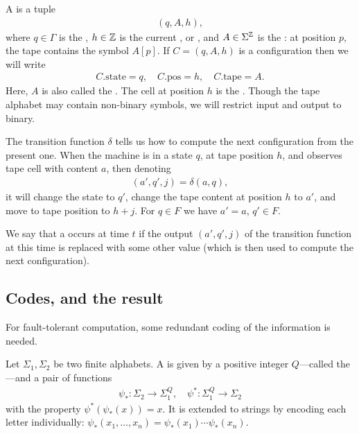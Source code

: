 \documentclass[12pt]{memoir}
\newcommand{\h}{h}
\newcommand{\pos}{\mathrm{pos}}
\newcommand{\state}{\mathrm{state}}
\newcommand{\tape}{\mathrm{tape}}
\begin{document}
    A  is a tuple
        \begin{align*}
             (q,A,\h),
        \end{align*}
    where \( q\in\Gamma \) is the , 
\( \h\in\bbZ \) is the current , or ,
and \( A\in\Sigma^{\mathbb{Z}} \) is the : 
at position \( p \), the tape contains the symbol \( A[p] \).
If \( C=(q,A,\h) \) is a configuration then we will write
        \begin{align*}
             C.\state=q,\quad C.\pos=\h, \quad C.\tape=A.
        \end{align*}
    Here, \( A \) is also called the .
    The cell at position \( \h \) is the  .
Though the tape alphabet may contain
non-binary symbols, we will restrict input and output to binary.

    The transition function \( \delta \) tells us how to compute the next
    configuration from the present one.
    When the machine is in a state \( q \), at tape position \( \h \), and
    observes tape cell with content \( a \), then denoting
         \begin{align*}
           (a',q',j)=\delta(a,q),
         \end{align*}
    it will change the state to \( q' \), change the
    tape content at position \( \h \) to \( a' \), and move to tape position to \( \h+j \).
    For \( q\in F \) we have \( a'=a \), \( q'\in F \).


\begin{definition}[Fault]\label{def:fault}
    We say that a  occurs at time \( t \) if the output \( (a',q',j) \) of the
    transition function at this time is replaced with some other value
    (which is then used to compute the next configuration).
\end{definition}


\subsection{Codes, and the result}

For fault-tolerant computation, some redundant coding of the information is needed.

\begin{definition}[Codes]\label{def:codes}
    Let \( \Sigma_{1},\Sigma_{2} \) be two finite alphabets.
    A  is given by a positive integer \( Q \)---called
    the ---and a pair of functions
    \begin{align*}
            \psi_{*} :\Sigma_{2}\to\Sigma_{1}^{Q},
            \quad
            \psi^{*}:\Sigma_{1}^{Q}\to\Sigma_{2}
    \end{align*}
    with the property \( \psi^{*}(\psi_{*}(x))=x \).
It is extended to strings by encoding each letter individually:
\( \psi_{*}(x_{1},\dots,x_{n})=\psi_{*}(x_{1})\dotsm\psi_{*}(x_{n}) \).
\end{definition}
\end{document}
